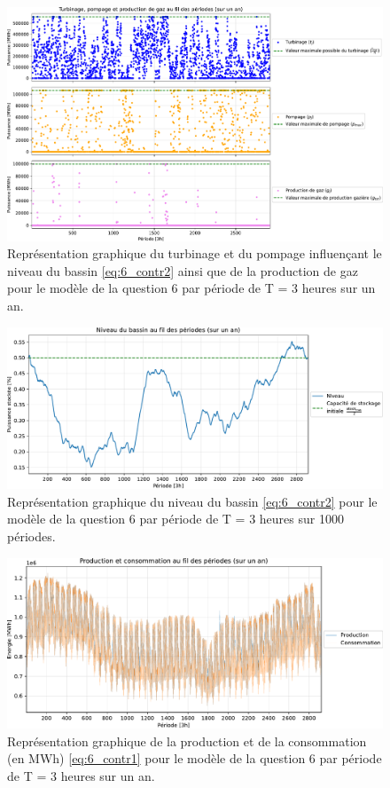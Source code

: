 \documentclass{article}
\begin{document}
\begin{figure}[H]
    \centering
    \includegraphics[scale=0.6]{GraphesP2/Productions_Q6.pdf}
    \caption{Représentation graphique du turbinage et du pompage
    influençant le niveau du bassin \eqref{eq:6_contr2} ainsi que de la production de gaz pour le modèle de la question 6 par période de T = 3 heures sur un an.} 
    \label{fig:Q61}
\end{figure}

\begin{figure}[h!]
    \centering
    \includegraphics[scale=0.6]{GraphesP2/Niveau_Bassin_Q6.pdf}
    \caption{Représentation graphique du niveau du bassin \eqref{eq:6_contr2} pour le modèle 
    de la question 6 par période de T = 3 heures sur 1000 périodes.} 
    \label{fig:Q62}
\end{figure}

\begin{figure}[H]
    \centering
    \includegraphics[scale=0.6]{GraphesP2/Prod_Cons_Q6.pdf}
    \caption{Représentation graphique de la production et de la consommation (en MWh) 
    \eqref{eq:6_contr1} pour le modèle de la question 6 par période de T = 3 heures sur un an.} 
    \label{fig:Q63}
\end{figure}
\end{document}
